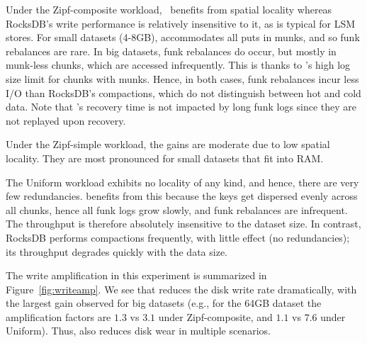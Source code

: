  Under the Zipf-composite workload, \sys\ benefits from spatial locality whereas RocksDB's write performance 
 is relatively insensitive to it, as is typical for LSM stores. For small datasets (4-8GB), \sys\/ accommodates 
all puts in munks, and so funk rebalances are rare. In big datasets, funk rebalances do occur, but mostly in 
munk-less chunks, which are accessed infrequently. This is thanks to \sys\/'s high log size limit for chunks 
with munks. Hence, in both cases, funk rebalances incur less I/O than RocksDB's compactions, 
which do not distinguish between hot and cold data. Note that \sys's recovery time is not impacted by 
long funk logs since they are not replayed upon recovery.

 Under the Zipf-simple workload, the gains are moderate due to low spatial locality. They are most pronounced 
 for small datasets that fit into RAM.
 
The Uniform workload exhibits no locality of any kind, and hence, there are very few redundancies. 
 \sys\/ benefits from this because the keys get dispersed evenly across all chunks, hence all funk logs grow 
 slowly, and funk rebalances are infrequent. The throughput is therefore  absolutely insensitive to the dataset 
 size. In contrast, RocksDB performs compactions frequently, with little effect (no redundancies); its throughput 
 degrades quickly with the data size.
 
   
The write amplification in this experiment is summarized in 
Figure~\ref{fig:writeamp}. We see that \sys\/ reduces the disk write rate dramatically, 
with the largest gain observed for big datasets (e.g.,  for the 64GB dataset 
the amplification factors are $1.3$ vs $3.1$ under Zipf-composite, and $1.1$ vs $7.6$ under Uniform). 
Thus, \sys\/ also reduces disk wear in multiple scenarios. 

